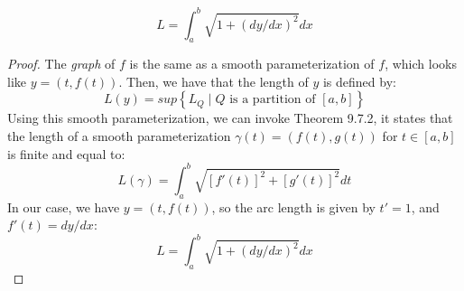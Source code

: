 \documentclass[hidelinks,12pt]{article}
\begin{document}
\begin{enumerate}
        \[L=\int_a^b\sqrt{1+(dy/dx)^2}dx\]
        \begin{proof}
            The \emph{graph} of $f$ is the same as a smooth parameterization of $f$, which looks like $y=(t,f(t))$. Then, we have that the length of $y$ is defined by:
            \[L(y)=sup\left\{L_Q\mid Q\text{ is a partition of }[a,b]\right\}\]
            Using this smooth parameterization, we can invoke Theorem 9.7.2, it states that the length of a smooth parameterization $\gamma(t)=(f(t),g(t))$ for $t\in[a,b]$ is finite and equal to:
            \[L(\gamma)=\int_a^b\sqrt{[f'(t)]^2+[g'(t)]^2}dt\]
            In our case, we have $y=(t,f(t))$, so the arc length is given by $t'=1$, and $f'(t)=dy/dx$:
            \[L=\int_a^b\sqrt{1+(dy/dx)^2}dx\]
        \end{proof}

\end{enumerate}
\end{document}
